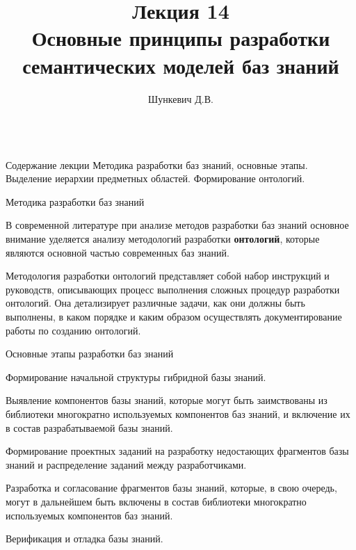 \documentclass{beamer}
\title{Лекция 14\\Основные принципы разработки семантических моделей баз знаний}
\author[]{Шункевич Д.В.}
\institute[]{Белорусский государственный университет информатики и радиоэлектроники}
\begin{document}
\begin{frame}
	\titlepage
\end{frame}

\begin{frame}{\\Содержание лекции}
	\topline
	\justifying
	Методика разработки баз знаний, основные этапы. Выделение иерархии предметных областей. Формирование онтологий.
\end{frame}

\begin{frame}{Методика разработки баз знаний}
	\topline
	\justifying 
	\begin{SCn}
	В современной литературе при анализе методов разработки баз знаний основное внимание уделяется анализу методологий разработки \textbf{онтологий}, которые являются основной частью современных баз знаний.
 
    Методология разработки онтологий представляет собой набор инструкций и руководств, описывающих процесс выполнения сложных процедур разработки онтологий. Она детализирует различные задачи, как они должны быть выполнены, в каком порядке и каким образом осуществлять документирование работы по созданию онтологий.
	\end{SCn}
\end{frame}

\begin{frame}{Основные этапы разработки баз знаний}
	\topline
	\justifying
	\begin{SCn}
        \vspace{8mm}
	\begin{textitemize}
		\item Формирование начальной структуры гибридной базы знаний.
            \item Выявление компонентов базы знаний, которые могут быть заимствованы из библиотеки многократно используемых компонентов баз знаний, и включение их в состав разрабатываемой базы знаний.
		\item Формирование проектных заданий на разработку недостающих фрагментов базы знаний и распределение заданий между разработчиками.
		\item Разработка и согласование фрагментов базы знаний, которые, в свою очередь, могут в дальнейшем быть включены в состав библиотеки многократно используемых компонентов баз знаний.
		\item Верификация и отладка базы знаний.
	\end{textitemize}
	\end{SCn}
\end{frame}
\end{document}
